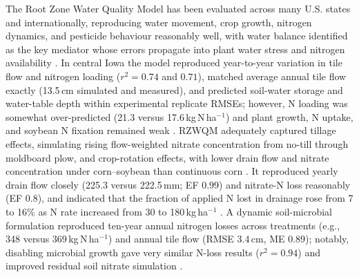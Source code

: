 The Root Zone Water Quality Model has been evaluated across many U.S. states and internationally, reproducing water movement, crop growth, nitrogen dynamics, and pesticide behaviour reasonably well, with water balance identified as the key mediator whose errors propagate into plant water stress and nitrogen availability \parencite{Ma2001}. In central Iowa the model reproduced year-to-year variation in tile flow and nitrogen loading ($r^2 = 0.74$ and $0.71$), matched average annual tile flow exactly (13.5\,cm simulated and measured), and predicted soil-water storage and water-table depth within experimental replicate RMSEs; however, N loading was somewhat over-predicted (21.3 versus 17.6\,kg\,N\,ha$^{-1}$) and plant growth, N uptake, and soybean N fixation remained weak \parencite{Ma2007}. RZWQM adequately captured tillage effects, simulating rising flow-weighted nitrate concentration from no-till through moldboard plow, and crop-rotation effects, with lower drain flow and nitrate concentration under corn--soybean than continuous corn \parencite{Ma2007b}. It reproduced yearly drain flow closely (225.3 versus 222.5\,mm; EF 0.99) and nitrate-N loss reasonably (EF 0.8), and indicated that the fraction of applied N lost in drainage rose from 7 to 16\% as N rate increased from 30 to 180\,kg\,ha$^{-1}$ \parencite{Bakhsh2004}. A dynamic soil-microbial formulation reproduced ten-year annual nitrogen losses across treatments (e.g., 348 versus 369\,kg\,N\,ha$^{-1}$) and annual tile flow (RMSE 3.4\,cm, ME 0.89); notably, disabling microbial growth gave very similar N-loss results ($r^2 = 0.94$) and improved residual soil nitrate simulation \parencite{Ma2008}.

